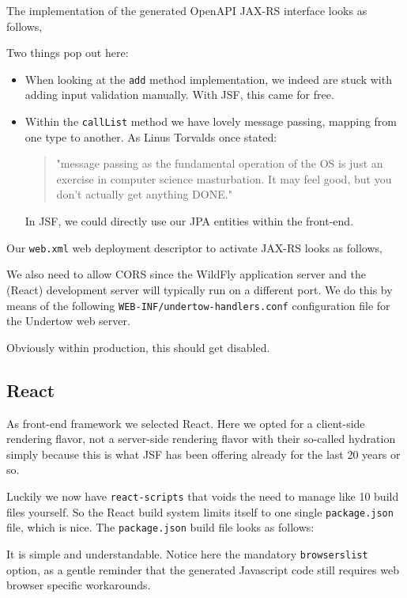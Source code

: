 The implementation of the generated OpenAPI JAX-RS interface looks as follows,

Two things pop out here:
\begin{itemize}
	\item When looking at the \texttt{add} method implementation, we indeed are stuck with adding input validation manually.
	With JSF, this came for free.
	\item Within the \texttt{callList} method we have lovely message passing, mapping from one type to another.
	As Linus Torvalds once stated:
	\begin{quote}
		"message passing as the fundamental operation of the OS is just an exercise in computer science masturbation.
		It may feel good, but you don’t actually get anything DONE."
	\end{quote}
	In JSF, we could directly use our JPA entities within the front-end.
\end{itemize}

Our \texttt{web.xml} web deployment descriptor to activate JAX-RS looks as follows,


We also need to allow CORS since the WildFly application server and the (React) development server will typically run on a different port.
We do this by means of the following \texttt{WEB-INF/undertow-handlers.conf} configuration file for the Undertow web server.

Obviously within production, this should get disabled.

\subsection{React}
As front-end framework we selected React.
Here we opted for a client-side rendering flavor, not a server-side rendering flavor with their so-called hydration simply because this is what JSF has been offering already for the last 20 years or so.

Luckily we now have \texttt{react-scripts} that voids the need to manage like 10 build files yourself.
So the React build system limits itself to one single \texttt{package.json} file, which is nice.
The \texttt{package.json} build file looks as follows:

It is simple and understandable.
Notice here the mandatory \texttt{browserslist} option, as a gentle reminder that the generated Javascript code still requires web browser specific workarounds.

